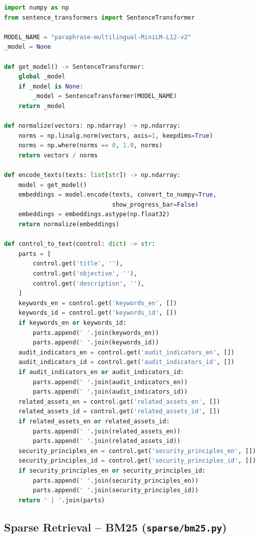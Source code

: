 \begin{lstlisting}[language=Python, caption={Fungsi konversi kontrol ISO ke teks, encoding, dan normalisasi vektor}, label={lst:embedding_model}]
import numpy as np
from sentence_transformers import SentenceTransformer

MODEL_NAME = "paraphrase-multilingual-MiniLM-L12-v2"
_model = None

def get_model() -> SentenceTransformer:
    global _model
    if _model is None:
        _model = SentenceTransformer(MODEL_NAME)
    return _model

def normalize(vectors: np.ndarray) -> np.ndarray:
    norms = np.linalg.norm(vectors, axis=1, keepdims=True)
    norms = np.where(norms == 0, 1.0, norms)
    return vectors / norms

def encode_texts(texts: list[str]) -> np.ndarray:
    model = get_model()
    embeddings = model.encode(texts, convert_to_numpy=True,
                              show_progress_bar=False)
    embeddings = embeddings.astype(np.float32)
    return normalize(embeddings)

def control_to_text(control: dict) -> str:
    parts = [
        control.get('title', ''),
        control.get('objective', ''),
        control.get('description', ''),
    ]
    keywords_en = control.get('keywords_en', [])
    keywords_id = control.get('keywords_id', [])
    if keywords_en or keywords_id:
        parts.append(' '.join(keywords_en))
        parts.append(' '.join(keywords_id))
    audit_indicators_en = control.get('audit_indicators_en', [])
    audit_indicators_id = control.get('audit_indicators_id', [])
    if audit_indicators_en or audit_indicators_id:
        parts.append(' '.join(audit_indicators_en))
        parts.append(' '.join(audit_indicators_id))
    related_assets_en = control.get('related_assets_en', [])
    related_assets_id = control.get('related_assets_id', [])
    if related_assets_en or related_assets_id:
        parts.append(' '.join(related_assets_en))
        parts.append(' '.join(related_assets_id))
    security_principles_en = control.get('security_principles_en', [])
    security_principles_id = control.get('security_principles_id', [])
    if security_principles_en or security_principles_id:
        parts.append(' '.join(security_principles_en))
        parts.append(' '.join(security_principles_id))
    return ' | '.join(parts)
\end{lstlisting}

\subsection{Sparse Retrieval -- BM25 (\texttt{sparse/bm25.py})}

